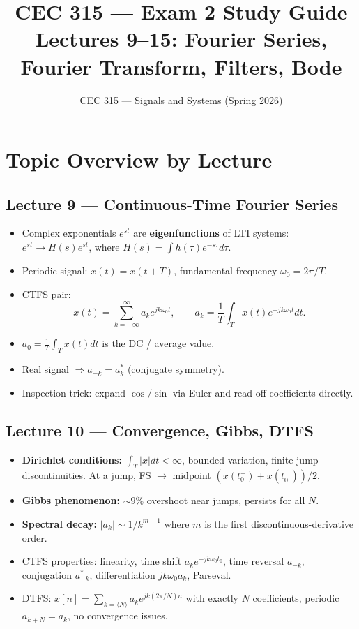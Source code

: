 \documentclass[11pt]{article}
\title{CEC 315 --- Exam 2 Study Guide\\\large Lectures 9--15: Fourier Series, Fourier Transform, Filters, Bode}
\author{CEC 315 --- Signals and Systems (Spring 2026)}
\date{}
\begin{document}
\maketitle
\tableofcontents
\newpage

\section{Topic Overview by Lecture}

\subsection{Lecture 9 --- Continuous-Time Fourier Series}
\begin{itemize}[leftmargin=*]
  \item Complex exponentials $e^{st}$ are \textbf{eigenfunctions} of LTI systems: $e^{st} \to H(s)e^{st}$, where $H(s) = \int h(\tau)e^{-s\tau}d\tau$.
  \item Periodic signal: $x(t)=x(t+T)$, fundamental frequency $\omega_0 = 2\pi/T$.
  \item CTFS pair:
  \[ x(t) = \sum_{k=-\infty}^{\infty} a_k e^{jk\omega_0 t},\qquad a_k = \frac{1}{T}\int_T x(t) e^{-jk\omega_0 t}dt. \]
  \item $a_0 = \frac{1}{T}\int_T x(t)dt$ is the DC / average value.
  \item Real signal $\Rightarrow a_{-k} = a_k^*$ (conjugate symmetry).
  \item Inspection trick: expand $\cos/\sin$ via Euler and read off coefficients directly.
\end{itemize}

\subsection{Lecture 10 --- Convergence, Gibbs, DTFS}
\begin{itemize}[leftmargin=*]
  \item \textbf{Dirichlet conditions:} $\int_T|x|dt<\infty$, bounded variation, finite-jump discontinuities. At a jump, FS $\to$ midpoint $(x(t_0^-)+x(t_0^+))/2$.
  \item \textbf{Gibbs phenomenon:} $\sim 9\%$ overshoot near jumps, persists for all $N$.
  \item \textbf{Spectral decay:} $|a_k| \sim 1/k^{m+1}$ where $m$ is the first discontinuous-derivative order.
  \item CTFS properties: linearity, time shift $a_k e^{-jk\omega_0 t_0}$, time reversal $a_{-k}$, conjugation $a_{-k}^*$, differentiation $jk\omega_0 a_k$, Parseval.
  \item DTFS: $x[n]=\sum_{k=\langle N\rangle} a_k e^{jk(2\pi/N)n}$ with exactly $N$ coefficients, periodic $a_{k+N}=a_k$, no convergence issues.
\end{itemize}
\end{document}

